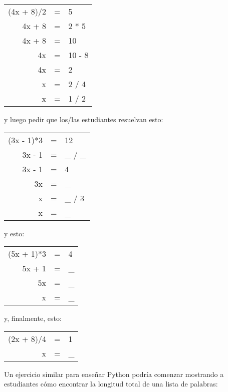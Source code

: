 \begin{center}
\begin{tabular}{rcl}
  (4x + 8)/2    & = &    5    \\
  4x + 8    & = &    2 * 5    \\
  4x + 8    & = &    10    \\
  4x        & = &    10 - 8    \\
  4x        & = &    2    \\
  x        & = &    2 / 4    \\
  x        & = &    1 / 2
\end{tabular}
\end{center}

\noindent
y luego pedir que los/las estudiantes resuelvan esto:

\begin{center}
\begin{tabular}{rcl}
  (3x - 1)*3    & = &    12    \\
  3x - 1    & = &    \_ / \_    \\
  3x - 1    & = &    4    \\
  3x        & = &    \_    \\
  x        & = &    \_ / 3    \\
  x        & = &    \_
\end{tabular}
\end{center}

\noindent
y esto:

\begin{center}
\begin{tabular}{rcl}
  (5x + 1)*3    & = &    4    \\
  5x + 1    & = &    \_     \\
  5x        & = &    \_     \\
  x        & = &    \_
\end{tabular}
\end{center}

\noindent
y, finalmente, esto:

\begin{center}
\begin{tabular}{rcl}
  (2x + 8)/4    & = &    1    \\
   x        & = &    \_
\end{tabular}
\end{center}

Un ejercicio similar para enseñar Python podría comenzar mostrando a estudiantes
cómo encontrar la longitud total de una lista de palabras:

